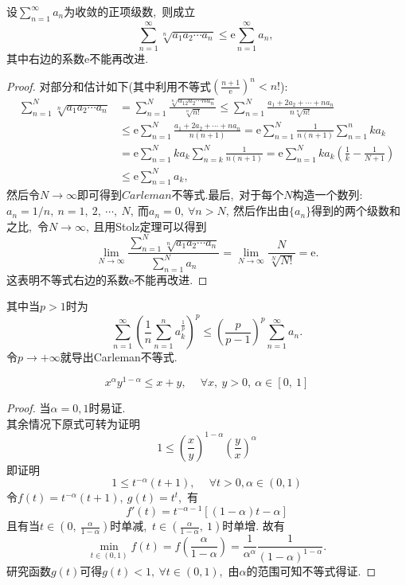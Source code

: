 \begin{proposition}[Carleman不等式]
	设$\sum\limits_{n=1}^{\infty}a_n$为收敛的正项级数,\ 则成立
	$$\sum\limits_{n=1}^{\infty}\sqrt[n]{a_1a_2\cdots a_n}\leqslant \mathrm{e}\sum\limits_{n=1}^{\infty}a_n,\ $$
	其中右边的系数$\mathrm{e}$不能再改进.
\end{proposition}
\begin{proof}
	对部分和估计如下(其中利用不等式$\left(\frac{n+1}{\mathrm{e}}\right)^{n}<n!$):
	\begin{align*}
		\sum\limits_{n=1}^{N}\sqrt[n]{a_1a_2\cdots a_n}&=\sum\limits_{n=1}^{N}\frac{\sqrt[n]{a_12a_2\cdots na_n}}{\sqrt[n]{n!}}\leqslant \sum\limits_{n=1}^{N}\frac{a_1+2a_2+\cdots+na_n}{n\sqrt[n]{n!}}\\
		&\leqslant\mathrm{e}\sum\limits_{n=1}^{N}\frac{a_1+2a_2+\cdots+na_n}{n(n+1)}=\mathrm{e}\sum\limits_{n=1}^{N}\frac{1}{n(n+1)}\sum\limits_{n=1}^{n}ka_k\\
		&=\mathrm{e}\sum\limits_{n=1}^{N}ka_k\sum\limits_{n=k}^{N}\frac{1}{n(n+1)}=\mathrm{e}\sum\limits_{n=1}^{N}ka_k(\frac{1}{k}-\frac{1}{N+1})\\
		&\leqslant\mathrm{e}\sum\limits_{n=1}^{N}a_k,\ 
	\end{align*}
	然后令$N\rightarrow\infty$即可得到$Carleman$不等式.最后,\ 对于每个$N$构造一个数列:$a_n=1/n,\ n=1,\ 2,\ \cdots,\ N,\ $而$a_n=0,\ \forall n>N,\ $然后作出由$\{a_n\}$得到的两个级数和之比,\ 令$N\rightarrow\infty,\ $且用Stolz定理可以得到
	$$\lim\limits_{N\rightarrow\infty}\frac{\sum\limits_{n=1}^{N}\sqrt[n]{a_1a_2\cdots a_n}}{\sum\limits_{n=1}^{N}a_n}=\lim\limits_{N\rightarrow\infty}\frac{N}{\sqrt[N]{N!}}=\mathrm{e}.$$
	这表明不等式右边的系数$\mathrm{e}$不能再改进.
\end{proof}
\begin{note}[Hardy不等式]
	其中当$p>1$时为
	$$\sum\limits_{n=1}^{\infty}\left(\frac{1}{n}\sum\limits_{n=1}^{n}a_k^{\frac{1}{p}}\right)^p\leqslant\left(\frac{p}{p-1}\right)^p\sum\limits_{n=1}^{\infty}a_n.$$
	令$p\to +\infty$就导出Carleman不等式.
\end{note}
\begin{proposition}[AM-GM不等式推广]
	$$x^\alpha y^{1-\alpha}\leqslant x+y,\ \quad\forall x,\ y>0,\ \alpha\in[0,\ 1]$$
\end{proposition}
\begin{proof}
	当$\alpha=0,1$时易证.\\
	其余情况下原式可转为证明
	$$1\leqslant\left(\frac{x}{y}\right)^{1-\alpha}\left(\frac{y}{x}\right)^{\alpha}$$
	即证明$$1\leqslant t^{-\alpha}(t+1),\ \quad\forall t>0,\alpha\in(0,1)$$
	令$f(t)=t^{-\alpha}(t+1),\ g(t)=t^t$,\ 有
	$$f'(t)=t^{-\alpha-1}[(1-\alpha)t-\alpha]$$
	且有当$t\in(0,\ \frac{\alpha}{1-\alpha})$时单减,\ $t\in(\frac{\alpha}{1-\alpha},\ 1)$时单增.
	故有
	$$\min\limits_{t\in(0,1)}f(t)=f(\frac{\alpha}{1-\alpha})=\frac{1}{\alpha^\alpha}\frac{1}{(1-\alpha)^{1-\alpha}}.$$
	研究函数$g(t)$可得$g(t)<1,\ \forall t\in(0,1)$,\ 由$\alpha$的范围可知不等式得证.
\end{proof}

